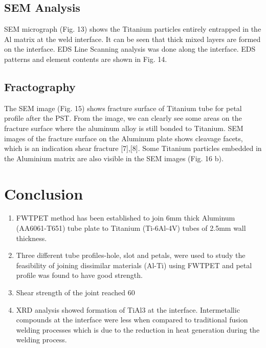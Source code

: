 \documentclass[preprint]{elsarticle}
\begin{document}
\subsection{SEM Analysis}
\label{subsec:SEM Analysis}
SEM micrograph (Fig. 13) shows the Titanium particles entirely entrapped in the Al matrix at the weld interface. It can be seen that thick mixed layers are formed on the interface. EDS Line Scanning analysis was done along the interface. EDS patterns and element contents are shown in Fig. 14.

\subsection{Fractography}
\label{subsec:Fractography}
The SEM image (Fig. 15) shows fracture surface of Titanium tube for petal profile after the PST. From the image, we can clearly see some areas on the fracture surface where the aluminum alloy is still bonded to Titanium. SEM images of the fracture surface on the Aluminum plate shows cleavage facets, which is an indication shear fracture [7],[8]. Some Titanium particles embedded in the Aluminium matrix are also visible in
the SEM images (Fig. 16 b).

\section{Conclusion}
\label{sec:Conclusion}
\begin{enumerate}[1.]
\item FWTPET method has been established to join 6mm thick Aluminum (AA6061-T651) tube plate to Titanium (Ti-6Al-4V) tubes of 2.5mm wall thickness.
\item Three different tube profiles-hole, slot and petals, were used to study the feasibility of joining dissimilar materials (Al-Ti) using FWTPET and petal profile was found to have good strength.
\item Shear strength of the joint reached 60%
\item XRD analysis showed formation of TiAl3 at the interface. Intermetallic compounds at the interface were less when compared to traditional fusion welding processes which is due to the reduction in heat generation during the welding process.
\end{enumerate}

\end{document}

